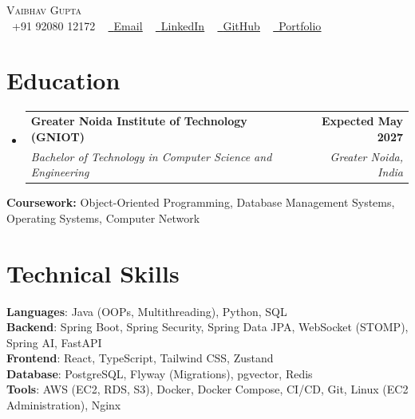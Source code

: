 \documentclass[letterpaper,10pt]{article}
\makeatletter
\newcommand{\resumeSubheading}[4]{
  \vspace{-2pt}\item
    \begin{tabular*}{1.0\textwidth}[t]{l@{\extracolsep{\fill}}r}
      \textbf{#1} & \textbf{\small #2} \\
      \textit{\small#3} & \textit{\small #4} \\
    \end{tabular*}\vspace{-7pt}
}
\newcommand{\resumeSubHeadingListStart}{\begin{itemize}[leftmargin=0.0in, label={}]}
\newcommand{\resumeSubHeadingListEnd}{\end{itemize}}
\makeatother
\begin{document}

\begin{center}
    {\Huge \scshape Vaibhav Gupta} \\ \vspace{1pt}
    \small \raisebox{-0.1\height}\faPhone\ +91 92080 12172 ~
    \href{mailto:vaibhv19.business@gmail.com}{\raisebox{-0.2\height}\faEnvelope\ \underline{Email}} ~
    \href{https://linkedin.com/in/vaibhv19}{\raisebox{-0.2\height}\faLinkedin\ \underline{LinkedIn}} ~
    \href{https://github.com/vaibhv19}{\raisebox{-0.2\height}\faGithub\ \underline{GitHub}} ~
    \href{https://vaibhv19.dev}{\raisebox{-0.2\height}\faGlobe\ \underline{Portfolio}}
    \vspace{-8pt}
\end{center}

\section{Education}
  \resumeSubHeadingListStart
    \resumeSubheading
      {Greater Noida Institute of Technology (GNIOT)}{Expected May 2027}
      {Bachelor of Technology in Computer Science and Engineering}{Greater Noida, India}
  \resumeSubHeadingListEnd
  \vspace{-4pt}
  \begin{itemize}[leftmargin=0in, label={}]
    \small{\item{\textbf{Coursework:} Object-Oriented Programming, Database Management Systems, Operating Systems, Computer Network}}
    \vspace{-10pt}
\end{itemize}

\section{Technical Skills}
 \begin{itemize}[leftmargin=0in, label={}]
    \small{\item{
     \textbf{Languages}{: Java (OOPs, Multithreading), Python, SQL} \\
     \textbf{Backend}{: Spring Boot, Spring Security, Spring Data JPA, WebSocket (STOMP), Spring AI, FastAPI} \\
     \textbf{Frontend}{: React, TypeScript, Tailwind CSS, Zustand} \\
     \textbf{Database}{: PostgreSQL, Flyway (Migrations), pgvector, Redis} \\
     \textbf{Tools}{: AWS (EC2, RDS, S3), Docker, Docker Compose, CI/CD, Git, Linux (EC2 Administration), Nginx} \\
    }}
 \end{itemize}
 \vspace{-12pt}
\end{document}
